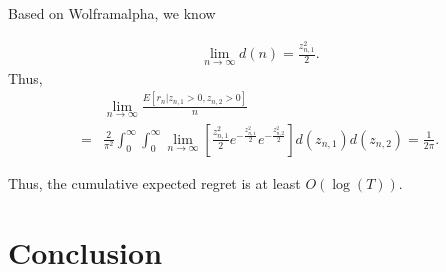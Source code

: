 \documentclass{article}
\begin{document}
Based on Wolframalpha, we know

\begin{align}
\lim_{n\rightarrow \infty} d(n)=\frac{z_{n,1}^2}{2}. \nonumber
\end{align}
Thus,
\begin{align}
&\lim_{n\rightarrow \infty}\frac{E[r_n| z_{n,1}>0, z_{n,2}>0]}{n} \nonumber \\
=&\frac{2}{\pi^2}\int_{0}^{\infty} \int_{0}^{\infty}\lim_{n\rightarrow \infty}\left[ \frac{z_{n,1}^2}{2}e^{-\frac{z_{n,1}^2}{2}}e^{-\frac{z_{n,2}^2}{2}}\right]d(z_{n,1})d(z_{n,2}) = \frac{1}{2\pi}. \nonumber
\end{align}


Thus, the cumulative expected regret is at least $O(\log(T))$.


\section{Conclusion}


{}

\end{document}
